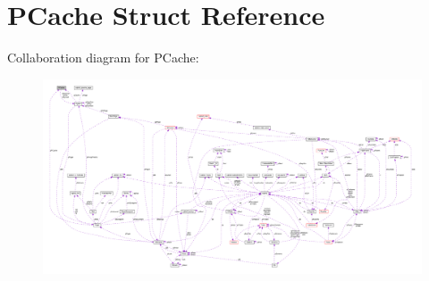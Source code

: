 \hypertarget{structPCache}{}\section{P\+Cache Struct Reference}
\label{structPCache}


Collaboration diagram for P\+Cache\+:\nopagebreak
\begin{figure}[H]
\begin{center}
\leavevmode
\includegraphics[width=350pt]{structPCache__coll__graph}
\end{center}
\end{figure}

